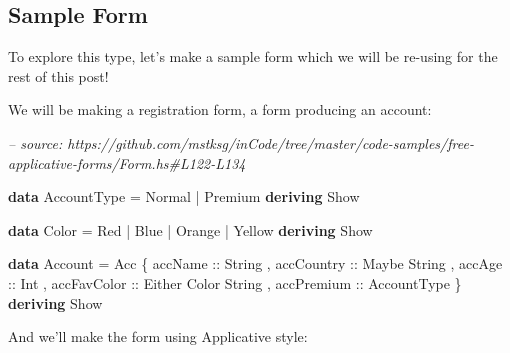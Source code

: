 \documentclass[]{article}
\newenvironment{Shaded}{}{}
\newcommand{\CommentTok}[1]{\textcolor[rgb]{0.38,0.63,0.69}{\textit{#1}}}
\newcommand{\DataTypeTok}[1]{\textcolor[rgb]{0.56,0.13,0.00}{#1}}
\newcommand{\FunctionTok}[1]{\textcolor[rgb]{0.02,0.16,0.49}{#1}}
\newcommand{\KeywordTok}[1]{\textcolor[rgb]{0.00,0.44,0.13}{\textbf{#1}}}
\newcommand{\NormalTok}[1]{#1}
\newcommand{\OtherTok}[1]{\textcolor[rgb]{0.00,0.44,0.13}{#1}}
\begin{document}
\hypertarget{sample-form}{%
\subsection{Sample Form}\label{sample-form}}

To explore this type, let's make a sample form which we will be re-using for the
rest of this post!

We will be making a registration form, a form producing an account:

\begin{Shaded}
\begin{Highlighting}[]
\CommentTok{-- source: https://github.com/mstksg/inCode/tree/master/code-samples/free-applicative-forms/Form.hs#L122-L134}

\KeywordTok{data} \DataTypeTok{AccountType} \FunctionTok{=} \DataTypeTok{Normal} \FunctionTok{|} \DataTypeTok{Premium}
    \KeywordTok{deriving} \DataTypeTok{Show}

\KeywordTok{data} \DataTypeTok{Color} \FunctionTok{=} \DataTypeTok{Red} \FunctionTok{|} \DataTypeTok{Blue} \FunctionTok{|} \DataTypeTok{Orange} \FunctionTok{|} \DataTypeTok{Yellow}
    \KeywordTok{deriving} \DataTypeTok{Show}

\KeywordTok{data} \DataTypeTok{Account} \FunctionTok{=} \DataTypeTok{Acc}\NormalTok{ \{}\OtherTok{ accName     ::} \DataTypeTok{String}
\NormalTok{                   ,}\OtherTok{ accCountry  ::} \DataTypeTok{Maybe} \DataTypeTok{String}
\NormalTok{                   ,}\OtherTok{ accAge      ::} \DataTypeTok{Int}
\NormalTok{                   ,}\OtherTok{ accFavColor ::} \DataTypeTok{Either} \DataTypeTok{Color} \DataTypeTok{String}
\NormalTok{                   ,}\OtherTok{ accPremium  ::} \DataTypeTok{AccountType}
\NormalTok{                   \}}
    \KeywordTok{deriving} \DataTypeTok{Show}
\end{Highlighting}
\end{Shaded}

And we'll make the form using Applicative style:
\end{document}
